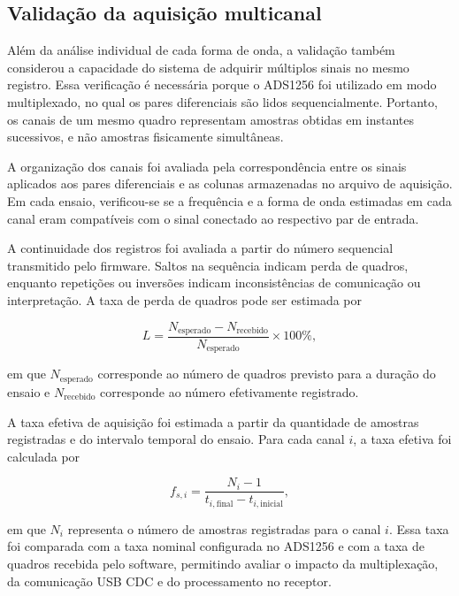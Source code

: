 \documentclass[a4paper,12pt]{fcte}
\begin{document}
\subsection{Validação da aquisição multicanal}
\label{subsec:validacao_multicanal}

Além da análise individual de cada forma de onda, a validação também considerou a capacidade do sistema de adquirir múltiplos sinais no mesmo registro. Essa verificação é necessária porque o ADS1256 foi utilizado em modo multiplexado, no qual os pares diferenciais são lidos sequencialmente. Portanto, os canais de um mesmo quadro representam amostras obtidas em instantes sucessivos, e não amostras fisicamente simultâneas.

A organização dos canais foi avaliada pela correspondência entre os sinais aplicados aos pares diferenciais e as colunas armazenadas no arquivo de aquisição. Em cada ensaio, verificou-se se a frequência e a forma de onda estimadas em cada canal eram compatíveis com o sinal conectado ao respectivo par de entrada.

A continuidade dos registros foi avaliada a partir do número sequencial transmitido pelo firmware. Saltos na sequência indicam perda de quadros, enquanto repetições ou inversões indicam inconsistências de comunicação ou interpretação. A taxa de perda de quadros pode ser estimada por

\begin{equation}
    L =
    \frac{
        N_{\mathrm{esperado}}-N_{\mathrm{recebido}}
    }
    {N_{\mathrm{esperado}}}
    \times 100\%,
    \label{eq:taxa_perda_quadros}
\end{equation}

\noindent
em que $N_{\mathrm{esperado}}$ corresponde ao número de quadros previsto para a duração do ensaio e $N_{\mathrm{recebido}}$ corresponde ao número efetivamente registrado.

A taxa efetiva de aquisição foi estimada a partir da quantidade de amostras registradas e do intervalo temporal do ensaio. Para cada canal $i$, a taxa efetiva foi calculada por

\begin{equation}
    f_{s,i} =
    \frac{N_i-1}
    {t_{i,\mathrm{final}}-t_{i,\mathrm{inicial}}},
    \label{eq:taxa_efetiva_canal}
\end{equation}

\noindent
em que $N_i$ representa o número de amostras registradas para o canal $i$. Essa taxa foi comparada com a taxa nominal configurada no ADS1256 e com a taxa de quadros recebida pelo software, permitindo avaliar o impacto da multiplexação, da comunicação USB CDC e do processamento no receptor.
\end{document}
